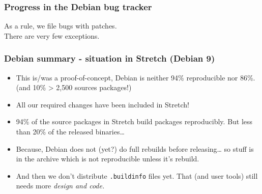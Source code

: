 \documentclass[14pt,aspectratio=169]{beamer}
\begin{document}
\begin{frame}
 \frametitle{Progress in the Debian bug tracker}
 \begin{center}
  \footnotesize{As a rule, we file bugs with patches. \\
  There are very few exceptions.}
  \vfill
 \end{center}
\end{frame}



\begin{frame}
	\frametitle{Debian summary - situation in Stretch (Debian 9)}
 \begin{itemize}
  \item This is/was a proof-of-concept, Debian is neither 94\% reproducible nor
  86\%. (and 10\% > 2,500 sources packages!)
  \item<2-3> All our required changes have been included in Stretch!
  \item<2-3> 94\% of the source packages in Stretch build packages reproducibly. But less than 20\% of the released binaries…
  \item<2-3> Because, Debian does not (yet?) do full rebuilds before
  releasing… so stuff is in the archive which is not reproducible unless it's
  rebuild.
  \item<3> And then we don't distribute \texttt{.buildinfo} files yet.
   That (and user tools) still needs more \it{design} and code.
 \end{itemize}
\end{frame}
\end{document}
